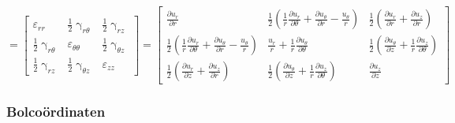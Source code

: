                 \begin{equation}
                    [\varepsilon] = \left[\begin{matrix}
                        \varepsilon_{rr} & \frac{1}{2}\upgamma_{r\theta} & \frac{1}{2}\upgamma_{rz} \\
                        \frac{1}{2}\upgamma_{r\theta} & \varepsilon_{\theta\theta} & \frac{1}{2}\upgamma_{\theta z} \\
                        \frac{1}{2}\upgamma_{rz} & \frac{1}{2}\upgamma_{\theta z} & \varepsilon_{zz}
                    \end{matrix}\right] = \left[\begin{matrix}
                        \frac{\partial u_r}{\partial r} & \frac{1}{2}\left(\frac{1}{r}\frac{\partial u_r}{\partial \theta} + \frac{\partial u_\theta}{\partial r} - \frac{u_{\theta}}{r}\right) & \frac{1}{2}\left(\frac{\partial u_r}{\partial r} + \frac{\partial u_z}{\partial r}\right)\\
                        \frac{1}{2}\left(\frac{1}{r}\frac{\partial u_r}{\partial \theta} + \frac{\partial u_{\theta}}{\partial r} - \frac{u_{\theta}}{r}\right) & \frac{u_r}{r} + \frac{1}{r}\frac{\partial u_{\theta}}{\partial \theta} & \frac{1}{2}\left(\frac{\partial u_{\theta}}{\partial z} + \frac{1}{r}\frac{\partial u_z}{\partial \theta}\right)\\
                        \frac{1}{2}\left(\frac{\partial u_r}{\partial z} + \frac{\partial u_z}{\partial r}\right) & \frac{1}{2}\left(\frac{\partial u_{\theta}}{\partial z} + \frac{1}{r}\frac{\partial u_z}{\partial \theta}\right) & \frac{\partial u_z}{\partial z}
                    \end{matrix}\right]
                    \label{rektensor_cilinder}
                \end{equation}

            \subsubsection{Bolcoördinaten}
            
